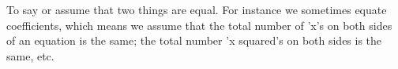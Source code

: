 To say or assume that two things are equal. For
instance we sometimes equate coefficients, which 
means we assume that the total number of 'x's on both
sides of an equation is the same; the total number
'x squared's on both sides is the same, etc.